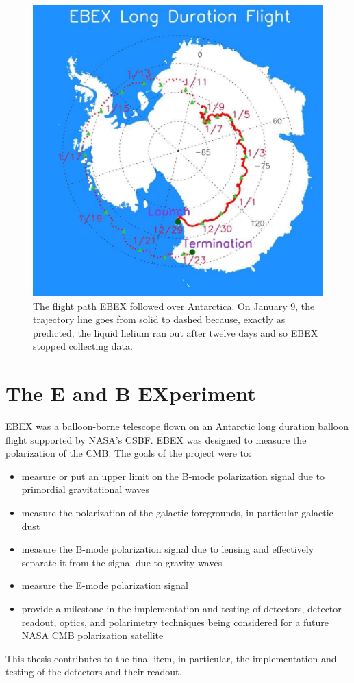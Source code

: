 \begin{figure}[htbp]
\begin{center}
\includegraphics[width=0.6\columnwidth]{figures/ebex_trajectory.jpg}
\caption[EBEX flight trajectory]{The flight path \ac{EBEX} followed over Antarctica. On January 9, the trajectory line goes from solid to dashed because, exactly as predicted, the liquid helium ran out after twelve days and so \ac{EBEX} stopped collecting data. 
\label{fig:flight_trajectory} }
\end{center}
\end{figure}




\section{The E and B EXperiment}
\label{sec:ebex}

\ac{EBEX} was a balloon-borne telescope flown on an Antarctic long duration balloon flight supported by \ac{NASA}'s \ac{CSBF}. 
\ac{EBEX} was designed to measure the polarization of the \ac{CMB}.
The goals of the project were to:
\begin{itemize}
\item measure or put an upper limit on the B-mode polarization signal due to primordial gravitational waves%
\item measure the polarization of the galactic foregrounds, in particular galactic dust
\item measure the B-mode polarization signal due to lensing and effectively separate it from the signal due to gravity waves
\item measure the E-mode polarization signal
\item provide a milestone in the implementation and testing of detectors, detector readout, optics, and polarimetry techniques being considered for a future NASA CMB polarization satellite
\end{itemize}
This thesis contributes to the final item, in particular, the implementation and testing of the detectors and their readout. 


